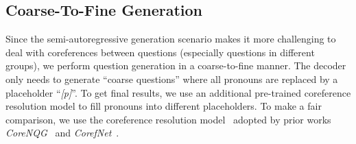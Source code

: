 \documentclass[11pt,a4paper]{article}
\begin{document}
\subsection{Coarse-To-Fine Generation}
Since the semi-autoregressive generation scenario makes it more challenging to deal with coreferences between questions (especially questions in different groups), we perform question generation in a coarse-to-fine manner.
The decoder only needs to generate ``coarse questions'' where all pronouns are replaced by a placeholder  ``\textit{[p]}''. To get final results, we use an additional pre-trained coreference resolution model to fill pronouns into different placeholders. 
To make a fair comparison, we use the coreference resolution model~\cite{clark2016deep} adopted by prior works \textit{CoreNQG}~\cite{du2018harvesting} and \textit{CorefNet}~\cite{gao2019interconnected}. 
\end{document}
